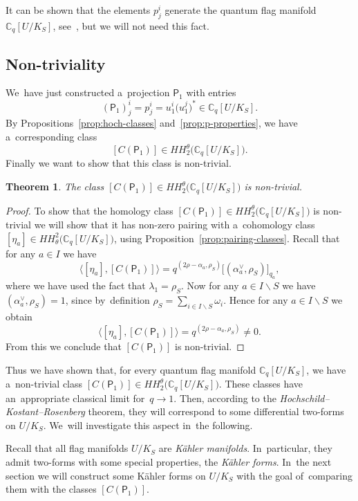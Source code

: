 \documentclass[pdftex]{sigma}
\numberwithin{equation}{section}
\newtheorem{Theorem}{Theorem}[section]
\newcommand{\Cqflag}{\mathbb{C}_q[U / K_S]}
\newcommand{\proj}{\mathsf{P}}
\begin{document}
\begin{Remark}
It can be shown that the elements $p^i_j$ generate the quantum flag manifold $\Cqflag$, see~\cite[Proposition~3.2]{heko06}, but we will not need this fact.
\end{Remark}

\subsection{Non-triviality}

We~have just constructed a~projection $\proj_1$ with entries
\[
(\proj_1)^i_j = p^i_j = u^i_1 \big(u^j_1\big)^* \in \Cqflag.
\]
By Propositions~\ref{prop:hoch-classes} and~\ref{prop:p-properties}, we have a~corresponding class
\[
[C(\proj_1)] \in HH^\theta_2\big(\Cqflag\big).
\]
Finally we want to show that this class is non-trivial.

\begin{Theorem}
The class $[C(\proj_1)] \in HH^\theta_2\big(\Cqflag\big)$ is non-trivial.
\end{Theorem}

\begin{proof}
To show that the homology class $[C(\proj_1)] \in HH^\theta_2\big(\Cqflag\big)$ is non-trivial we will show that it has non-zero pairing with a~cohomology class $[\eta_a] \in HH^2_\theta\big(\Cqflag\big)$, using Proposition~\ref{prop:pairing-classes}.
Recall that for any $a \in I$ we have
\[
\big\langle [\eta_a], [C(\proj_1)] \big\rangle = q^{(2 \rho - \alpha_a, \rho_S)}
\big[(\alpha_a^\vee, \rho_S)\big]_{q_a},
\]
where we have used the fact that $\lambda_1 = \rho_S$.
Now for any $a \in I \backslash S$ we have $(\alpha_a^\vee, \rho_S) = 1$, since by~definition $\rho_S = \sum_{i \in I \backslash S} \omega_i$.
Hence for any $a \in I \backslash S$ we obtain
\[
\big\langle [\eta_a], [C(\proj_1)] \big\rangle = q^{(2 \rho - \alpha_a, \rho_S)} \neq 0.
\]
From this we conclude that $[C(\proj_1)]$ is non-trivial.
\end{proof}

Thus we have shown that, for every quantum flag manifold $\Cqflag$, we have a~non-trivial class $[C(\proj_1)] \in HH^\theta_2\big(\Cqflag\big)$.
These classes have an~appropriate classical limit for~$q \to 1$.
Then, according to the \emph{Hoch\-schild--Kostant--Rosenberg} theorem, they will correspond to some differential two-forms on $U / K_S$.
We~will investigate this aspect in~the following.

Recall that all flag manifolds $U / K_S$ are \emph{K\"ahler manifolds}.
In~particular, they admit two-forms with some special properties, the \emph{K\"ahler forms}.
In~the next section we will construct some K\"ahler forms on $U / K_S$ with the goal of~comparing them with the classes $[C(\proj_1)]$.
\end{document}
